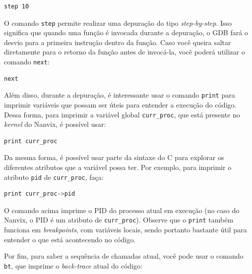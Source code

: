 \documentclass[11pt]{article}
\begin{document}
\begin{lstlisting}[language=sh,numbers=none,frame=single]
step 10
\end{lstlisting}

\vspace{0.3cm}
O comando \texttt{step} permite realizar uma depuração do tipo \textit{step-by-step}. Isso significa que quando uma função é invocada durante a depuração, o GDB fará o desvio para a primeira instrução dentro da função. Caso você queira saltar diretamente para o retorno da função antes de invocá-la, você poderá utilizar o comando \texttt{next}:\\

\begin{lstlisting}[language=sh,numbers=none,frame=single]
next
\end{lstlisting}

\vspace{0.3cm}
Além disso, durante a depuração, é interessante usar o comando \texttt{print} para imprimir variáveis que possam ser úteis para entender a execução do código. Dessa forma, para imprimir a variável global \texttt{curr\_proc}, que está presente no \textit{kernel} do Nanvix, é possível usar:\\

\begin{lstlisting}[language=sh,numbers=none,frame=single]
print curr_proc
\end{lstlisting}

Da mesma forma, é possível usar parte da sintaxe do C para explorar os diferentes atributos que a variável possa ter. Por exemplo, para imprimir o atributo \texttt{pid} de \texttt{curr\_proc}, faça:\\

\begin{lstlisting}[language=sh,numbers=none,frame=single]
print curr_proc->pid
\end{lstlisting}

\vspace{0.3cm}
O comando acima imprime o PID do processo atual em execução (no caso do Nanvix, o PID é um atributo de \texttt{curr\_proc}). Observe que o \texttt{print} também funciona em \textit{breakpoints}, com variáveis locais, sendo portanto bastante útil para entender o que está acontecendo no código.

Por fim, para saber a sequência de chamadas atual, você pode usar o comando \texttt{bt}, que imprime o \textit{back-trace} atual do código:\\
\end{document}
